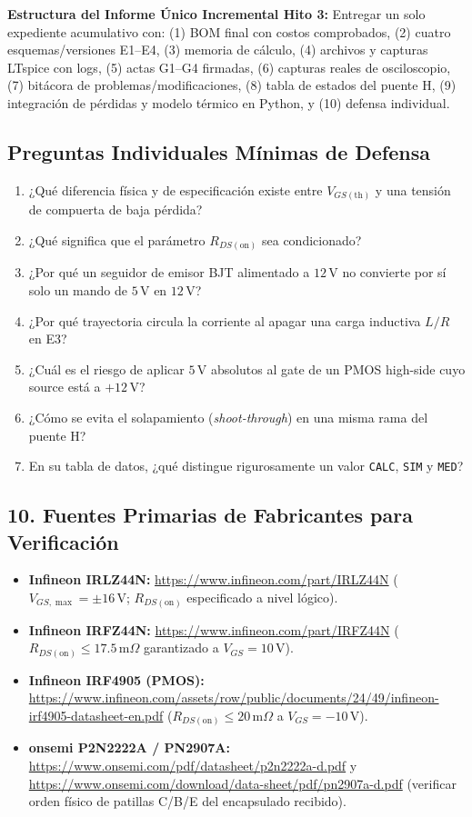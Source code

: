 \documentclass[10pt, a4paper, landscape]{article}
\begin{document}
\noindent
\textbf{Estructura del Informe Único Incremental Hito 3:} Entregar un solo expediente acumulativo con: (1) BOM final con costos comprobados, (2) cuatro esquemas/versiones E1--E4, (3) memoria de cálculo, (4) archivos y capturas LTspice con logs, (5) actas G1--G4 firmadas, (6) capturas reales de osciloscopio, (7) bitácora de problemas/modificaciones, (8) tabla de estados del puente H, (9) integración de pérdidas y modelo térmico en Python, y (10) defensa individual.

\subsection*{Preguntas Individuales Mínimas de Defensa}
\begin{enumerate}[noitemsep, topsep=2pt]
    \item ¿Qué diferencia física y de especificación existe entre $V_{GS(\text{th})}$ y una tensión de compuerta de baja pérdida?
    \item ¿Qué significa que el parámetro $R_{DS(\text{on})}$ sea condicionado?
    \item ¿Por qué un seguidor de emisor BJT alimentado a $12\,\text{V}$ no convierte por sí solo un mando de $5\,\text{V}$ en $12\,\text{V}$?
    \item ¿Por qué trayectoria circula la corriente al apagar una carga inductiva $L/R$ en E3?
    \item ¿Cuál es el riesgo de aplicar $5\,\text{V}$ absolutos al gate de un PMOS high-side cuyo source está a $+12\,\text{V}$?
    \item ¿Cómo se evita el solapamiento (\textit{shoot-through}) en una misma rama del puente H?
    \item En su tabla de datos, ¿qué distingue rigurosamente un valor \texttt{CALC}, \texttt{SIM} y \texttt{MED}?
\end{enumerate}

\subsection*{10. Fuentes Primarias de Fabricantes para Verificación}
\begin{itemize}[noitemsep, topsep=2pt]
    \item \textbf{Infineon IRLZ44N:} \url{https://www.infineon.com/part/IRLZ44N} ($V_{GS,\max} = \pm 16\,\text{V}$; $R_{DS(\text{on})}$ especificado a nivel lógico).
    \item \textbf{Infineon IRFZ44N:} \url{https://www.infineon.com/part/IRFZ44N} ($R_{DS(\text{on})} \le 17.5\,\text{m}\Omega$ garantizado a $V_{GS} = 10\,\text{V}$).
    \item \textbf{Infineon IRF4905 (PMOS):} \url{https://www.infineon.com/assets/row/public/documents/24/49/infineon-irf4905-datasheet-en.pdf} ($R_{DS(\text{on})} \le 20\,\text{m}\Omega$ a $V_{GS} = -10\,\text{V}$).
    \item \textbf{onsemi P2N2222A / PN2907A:} \url{https://www.onsemi.com/pdf/datasheet/p2n2222a-d.pdf} y \url{https://www.onsemi.com/download/data-sheet/pdf/pn2907a-d.pdf} (verificar orden físico de patillas C/B/E del encapsulado recibido).
\end{itemize}
\end{document}
